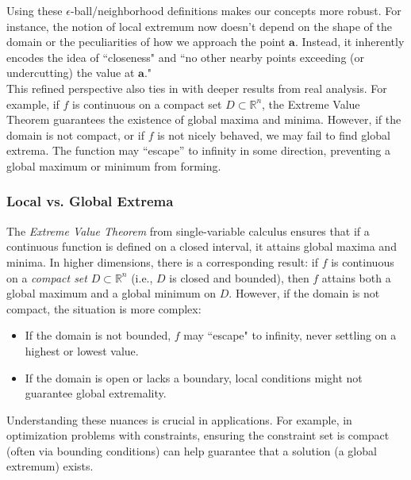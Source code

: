 \noindent Using these $\epsilon$-ball/neighborhood definitions makes our concepts more robust. For instance, the notion of local extremum now doesn’t depend on the shape of the domain or the peculiarities of how we approach the point \(\mathbf{a}\). Instead, it inherently encodes the idea of “closeness" and “no other nearby points exceeding (or undercutting) the value at \(\mathbf{a}\)." \\

\noindent This refined perspective also ties in with deeper results from real analysis. For example, if \( f \) is continuous on a compact set \( D \subset \mathbb{R}^n \), the Extreme Value Theorem guarantees the existence of global maxima and minima. However, if the domain is not compact, or if \( f \) is not nicely behaved, we may fail to find global extrema. The function may “escape” to infinity in some direction, preventing a global maximum or minimum from forming. 


\subsubsection*{Local vs. Global Extrema}   

\noindent The \textit{Extreme Value Theorem} from single-variable calculus ensures that if a continuous function is defined on a closed interval, it attains global maxima and minima. In higher dimensions, there is a corresponding result: if \( f \) is continuous on a \textit{compact set} \( D \subset \mathbb{R}^n \) (i.e., \( D \) is closed and bounded), then \( f \) attains both a global maximum and a global minimum on \( D \). However, if the domain is not compact, the situation is more complex:
\begin{itemize}
    \item If the domain is not bounded, \( f \) may ``escape" to infinity, never settling on a highest or lowest value.
    \item If the domain is open or lacks a boundary, local conditions might not guarantee global extremality.
\end{itemize}

\noindent Understanding these nuances is crucial in applications. For example, in optimization problems with constraints, ensuring the constraint set is compact (often via bounding conditions) can help guarantee that a solution (a global extremum) exists. \\

